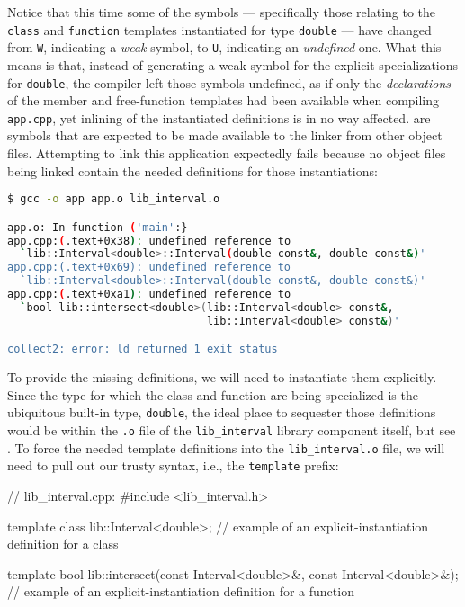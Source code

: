 \noindent Notice that this time some of the symbols --- specifically those
relating to the \lstinline!class! and \lstinline!function! templates
instantiated for type \lstinline!double! --- have changed from \lstinline!W!,
indicating a \emph{weak} symbol, to \lstinline!U!, indicating an
\emph{undefined} one. What this means is that, instead of generating a
weak symbol for the explicit specializations for \lstinline!double!, the
compiler left those symbols undefined, as if only the
\emph{declarations} of the member and free-function templates had been
available when compiling \lstinline!app.cpp!, yet inlining of the
instantiated definitions is in no way affected.  are symbols that are expected to be made available to the
linker from other object files. Attempting to link this application
expectedly fails because no object files being linked contain the needed
definitions for those instantiations:

\begin{lstlisting}[language=bash]
$ gcc -o app app.o lib_interval.o

app.o: In function ('main':}
app.cpp:(.text+0x38): undefined reference to
  `lib::Interval<double>::Interval(double const&, double const&)'
app.cpp:(.text+0x69): undefined reference to
  `lib::Interval<double>::Interval(double const&, double const&)'
app.cpp:(.text+0xa1): undefined reference to
  `bool lib::intersect<double>(lib::Interval<double> const&,
                               lib::Interval<double> const&)'

collect2: error: ld returned 1 exit status
\end{lstlisting}

\noindent To provide the missing definitions, we will need to instantiate them
explicitly. Since the type for which the class and function are being
specialized is the ubiquitous built-in type, \lstinline!double!, the ideal
place to sequester those definitions would be within the \lstinline!.o!
file of the \lstinline!lib_interval! library component itself, but see . To force the needed
template definitions into the \lstinline!lib_interval.o! file, we will
need to pull out our trusty  syntax, i.e., the \lstinline!template! prefix:

\begin{emcppslisting}[emcppsbatch=e3]
// lib_interval.cpp:
#include <lib_interval.h>

template class lib::Interval<double>;
    // example of an explicit-instantiation definition for a class

template bool lib::intersect(const Interval<double>&, const Interval<double>&);
    // example of an explicit-instantiation definition for a function
\end{emcppslisting}

